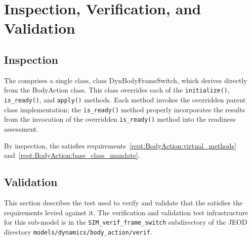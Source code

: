 %

\chapter{Inspection, Verification, and Validation}\label{ch:\modelpartid:ivv}
\section{Inspection}\label{sec:DynBodyFrameSwitch:inspect}

\label{inspect:DynBodyFrameSwitch:design}
The \partxname comprises a single class, class DynBodyFrameSwitch, which
derives directly from the BodyAction class. This class overrides each of
the {\tt initialize()}, {\tt is\_ready()}, and {\tt apply()} methods.
Each method invokes the overridden parent class implementation; the
{\tt is\_ready()} method properly incorporates the results from
the invocation of the overridden {\tt is\_ready()} method into the readiness
assessment.

By inspection, the \partxname satisfies
requirements~\ref{reqt:BodyAction:virtual_methods}
and~\ref{reqt:BodyAction:base_class_mandate}.

\section{Validation}
This section describes the test used to verify and validate
that the \partxname satisfies the requirements levied against it.
The verification and validation test infrastructure
for this sub-model is in the {\tt SIM\_verif\_frame\_switch} subdirectory of
the JEOD directory {\tt models/dynamics/body\_action/verif}.

